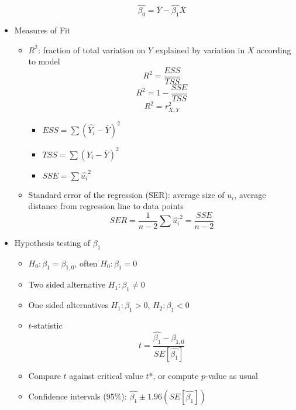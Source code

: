 \documentclass{article}
\begin{document}
\begin{itemize}
\begin{itemize}
\begin{equation*}
		\end{equation*}
		\begin{equation*}
\hat{\beta_0} = \bar{Y}-\hat{\beta_1}\bar{X}		\end{equation*}
		\end{itemize}
\clearpage 
	\item Measures of Fit
	\begin{itemize}
		\item $R^2$: fraction of total variation on $Y$ explained by variation in $X$ according to model
		\begin{equation*}
		R^2=\frac{ESS}{TSS}	
		\end{equation*}
		\begin{equation*}
		R^2=1-\frac{SSE}{TSS}	
		\end{equation*}
		\begin{equation*}
		R^2=r_{X,Y}^2	
		\end{equation*}
		\begin{itemize}
			\item $ESS = \sum (\hat{Y_i}-\bar{Y})^2$
			\item $TSS = \sum(Y_i-\bar{Y})^2$
			\item $SSE = \sum \hat{u_i}^2$ 
		\end{itemize}
		\item Standard error of the regression (SER): average size of $u_i$, average distance from regression line to data points
		\begin{equation*}
		SER=\frac{1}{n-2}\sum \hat{u_i}^2 = \frac{SSE}{n-2}
		\end{equation*}
	\end{itemize}
	\item Hypothesis testing of $\beta_1$
	\begin{itemize}
		\item $H_0: \beta_1=\beta_{1,0}$, often $H_0: \beta_1=0$
		\item Two sided alternative $H_1: \beta_1 \neq 0$
		\item One sided alternatives $H_1: \beta_1 > 0$, $H_2: \beta_1 < 0$
		\item $t$-statistic
		\begin{equation*}
t=\frac{\hat{\beta_1}-\beta_{1,0}}{SE[\hat{\beta_1}]}
		\end{equation*}
		\item Compare $t$ against critical value $t$*, or compute $p$-value as usual 
		\item Confidence intervals (95\%): $\hat{\beta_1} \pm 1.96(SE[\hat{\beta_1}])$

\end{itemize}
\end{itemize}
\end{document}
